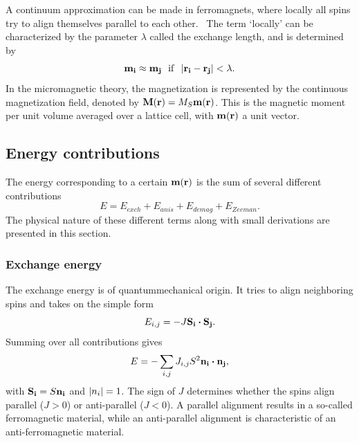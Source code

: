 \documentclass[10pt,a4paper]{article}
\begin{document}
A continuum approximation can be made in ferromagnets, where locally all spins try to align themselves parallel to each other.~\cite{abert2013discrete} The term `locally' can be characterized by the parameter $\lambda$ called the exchange length, and is determined by
\begin{equation}
    \vb{m_i} \approx \vb{m_j}~~\mathrm{if}~~\abs{\vb{r_i} - \vb{r_j}} < \lambda \mathrm{.}
\end{equation}
In the micromagnetic theory, the magnetization is represented by the continuous magnetization field, denoted by $\vb{M}(\vb{r}) = M_S \vb{m}(\vb{r})$. This is the magnetic moment per unit volume averaged over a lattice cell, with $\vb{m}(\vb{r})$ a unit vector.~\cite{Gilbert1956}

\subsection{Energy contributions}
The energy corresponding to a certain $\vb{m}(\vb{r})$ is the sum of several different contributions
\begin{equation}
    E = E_{exch} + E_{anis} + E_{demag} + E_{Zeeman} \mathrm{.} \label{eq:Energy_Terms}
\end{equation}
The physical nature of these different terms along with small derivations are presented in this section.
\subsubsection{Exchange energy}
The exchange energy is of quantummechanical origin. It tries to align neighboring spins and takes on the simple form
\begin{equation}
    E_{i,j} = -J \vb{S_i} \vdot \vb{S_j} \mathrm{.}
    \label{eq:Energy_ExchangeEnergy_Discrete}
\end{equation}
Summing over all contributions gives
\begin{equation}
    E = -\sum_{i,j} J_{i,j} S^2 \vb{n_i} \vdot \vb{n_j} \mathrm{,}
    \label{eq:Energy_ExchangeEnergy_SumDiscrete}
\end{equation}
with $\vb{S_i} = S \vb{n_i}$ and $\abs{n_i} = 1$. 
The sign of $J$ determines whether the spins align parallel ($J>0$) or anti-parallel ($J<0$). A parallel alignment results in a so-called ferromagnetic material, while an anti-parallel alignment is characteristic of an anti-ferromagnetic material.
\end{document}
